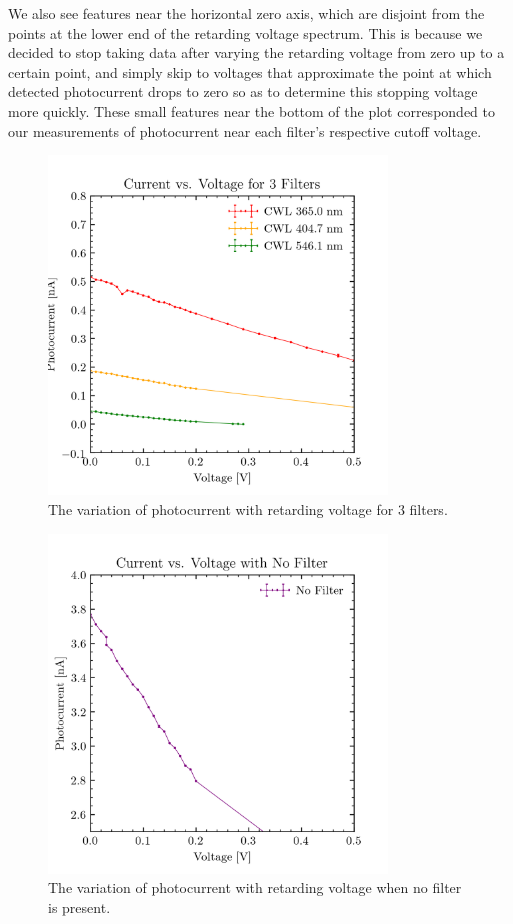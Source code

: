 \documentclass[aps,twocolumn,secnumarabic,balancelastpage,amsmath,amssymb,nofootinbib, floatfix]{revtex4-2}
\begin{document}
We also see features near the horizontal zero axis, which are disjoint from the points at the lower end of the retarding voltage spectrum. This is because we decided to stop taking data after varying the retarding voltage from zero up to a certain point, and simply skip to voltages that approximate the point at which detected photocurrent drops to zero so as to determine this stopping voltage more quickly. These small features near the bottom of the plot corresponded to our measurements of photocurrent near each filter's respective cutoff voltage. 


\begin{figure}[H]
	\includegraphics[width=9cm]{4_lenses_scatter.png}
	\caption{The variation of photocurrent with retarding voltage for  3 filters.}
	\label{fig:4filters}
\end{figure}
 

\begin{figure}[H]
	\includegraphics[width=9cm]{nolens_scatter.png}
	\caption{The variation of photocurrent with retarding voltage when no filter is present.}
	\label{fig:nofilter}
\end{figure}
\end{document}
